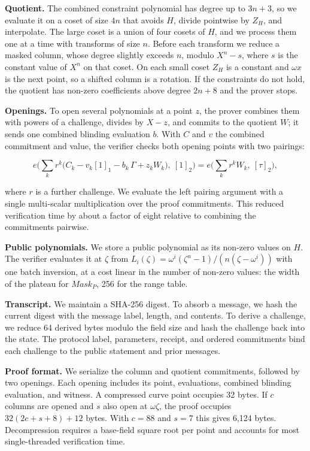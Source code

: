 \textbf{Quotient.} The combined constraint polynomial has degree up to \(3n + 3\), so we evaluate it on a coset of size \(4n\) that avoids \(H\), divide pointwise by \(Z_H\), and interpolate. The large coset is a union of four cosets of \(H\), and we process them one at a time with transforms of size \(n\). Before each transform we reduce a masked column, whose degree slightly exceeds \(n\), modulo \(X^n - s\), where \(s\) is the constant value of \(X^n\) on that coset. On each small coset \(Z_H\) is a constant and \(\omega x\) is the next point, so a shifted column is a rotation. If the constraints do not hold, the quotient has non-zero coefficients above degree \(2n + 8\) and the prover stops.

\textbf{Openings.} To open several polynomials at a point \(z\), the prover combines them with powers of a challenge, divides by \(X - z\), and commits to the quotient \(W\); it sends one combined blinding evaluation \(b\). With \(C\) and \(v\) the combined commitment and value, the verifier checks both opening points with two pairings:

\[
e\Big(\sum_{k} r^k \big(C_k - v_k [1]_1 - b_k\, \Gamma + z_k W_k\big),\ [1]_2\Big) = e\Big(\sum_{k} r^k W_k,\ [\tau]_2\Big),
\]

where \(r\) is a further challenge. We evaluate the left pairing argument with a single multi-scalar multiplication over the proof commitments. This reduced verification time by about a factor of eight relative to combining the commitments pairwise.

\textbf{Public polynomials.} We store a public polynomial as its non-zero values on \(H\). The verifier evaluates it at \(\zeta\) from \(L_i(\zeta) = \omega^i(\zeta^n - 1)/(n(\zeta - \omega^i))\) with one batch inversion, at a cost linear in the number of non-zero values: the width of the plateau for \(Mask_P\), 256 for the range table.

\textbf{Transcript.} We maintain a SHA-256 digest. To absorb a message, we hash the current digest with the message label, length, and contents. To derive a challenge, we reduce 64 derived bytes modulo the field size and hash the challenge back into the state. The protocol label, parameters, receipt, and ordered commitments bind each challenge to the public statement and prior messages.

\textbf{Proof format.} We serialize the column and quotient commitments, followed by two openings. Each opening includes its point, evaluations, combined blinding evaluation, and witness. A compressed curve point occupies 32 bytes. If \(c\) columns are opened and \(s\) also open at \(\omega\zeta\), the proof occupies \(32(2c+s+8)+12\) bytes. With \(c=88\) and \(s=7\) this gives 6,124 bytes. Decompression requires a base-field square root per point and accounts for most single-threaded verification time.

